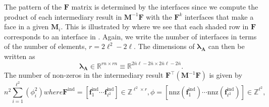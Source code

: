 %
%
%
The pattern of the $\textbf{F}$ matrix is determined by the interfaces since we compute the product of each intermediary result in $\textbf{M}^{-1} \textbf{F}$ with the $\textbf{F}^k$ interfaces that make a face in a given $\textbf{M}_i$. 
This is illustrated by  where we see that each shaded row in $\textbf{F}$ corresponds to an interface in .
Again, we write the number of interfaces in terms of the number of elements, $r = 2\ell^2 - 2\ell$. 
The dimensions of $\symbf{\lambda}_\textbf{A}$ can then be written as 
\begin{equation}
	\symbf{\lambda}_\textbf{A} \in \mathbb{R}^{rn \times rn} \equiv \mathbb{R}^{2\bar{n}\ell - 2\bar{n} \times 2\bar{n}\ell - 2\bar{n}}. 
\end{equation}
\noindent
The number of non-zeros in the intermediary result $\textbf{F}^{\intercal}(\textbf{M}^{-1}\textbf{F})$ is given by
\begin{subequations}
\begin{equation}
	n^2 \sum_{i=1}^{\ell^2} (\phi_i^2)
	\label{eqn:nz_sum}
\end{equation}
where
\begin{equation}
	\textbf{F}^{\text{ind}} = \left[\textbf{f}^{\text{ind}}_1 \cdots \textbf{f}^{\text{ind}}_{\ell^2}\right] \in \mathbb{Z}^{\ell^2 \times r},
\end{equation}
\begin{equation}
	\phi = \left[ \text{nnz}(\textbf{f}^{\text{ind}}_1) \cdots \text{nnz}(\textbf{f}^{\text{ind}}_{\ell^2}) \right] \in \mathbb{Z}^{\ell^2}, 
\end{equation}
\end{subequations}
